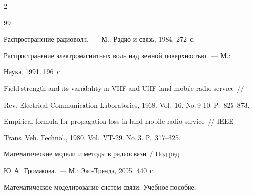 \begin{multicols}{2}
{{%




\begin{thebibliography}{99}









Распространение радиоволн.~--- М.: Радио и связь, 1984. 272~с.









Распространение электромагнитных волн над земной поверхностью.~--- М.: 


Наука, 1991. 196~с. 









Field strength and its variability in VHF and UHF land-mobile radio service~// 


Rev. Electrical Communication Laboratories, 1968. Vol.~16. No.\,9-10. P.~825--873.









Empirical formula for propagation loss in land mobile radio service~// IEEE 


Trans. Veh. Technol., 1980. Vol.~VT-29. No.\,3. P.~317--325.









Математические модели и методы в радиосвязи~/ Под ред. 


Ю.\,А.~Громакова.~--- М.: Эко-Трендз, 2005. 440~с.









Математическое моделирование сис\-тем связи: Учебное пособие.~--- 



\end{thebibliography}}}
\end{multicols}
